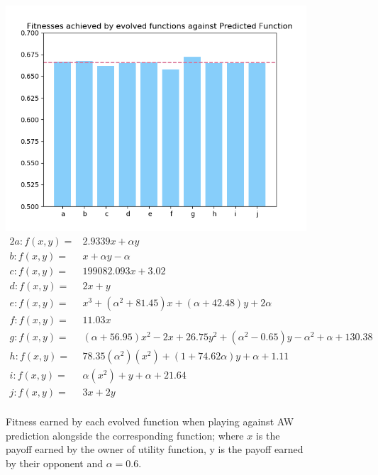 \documentclass[11pt]{book}
\begin{document}
\begin{figure}
	\centering
	\includegraphics[scale=0.7]{resources/ylim_barchart_fitness_earned_against_target_r_06.png}
	\begin{alignat*}{2}
		a: f(x, y) = & 2.9339x + \alpha y&\\
		b: f(x, y) = & x + \alpha y -\alpha &\\
		c: f(x, y) = & 199082.093x + 3.02&\\
		d: f(x, y) = & 2x + y&\\
		e: f(x, y) = & x^3 + (\alpha^2 + 81.45)x + (\alpha+42.48)y + 2\alpha &\\
		f: f(x, y) = & 11.03x&\\
		g: f(x, y) = & (\alpha + 56.95)x^2 - 2x + 26.75y^2  + (\alpha^2 - 0.65)y  - \alpha^2 + \alpha + 130.38&\\
		h: f(x, y) = & 78.35(\alpha^2)(x^2) + (1 +74.62\alpha )y + \alpha + 1.11&\\
		i: f(x, y) = & \alpha (x^2) + y + \alpha + 21.64&\\
		j: f(x, y) = & 3x + 2y&\\
	\end{alignat*}
	\caption{Fitness earned by each evolved function when playing against AW prediction alongside the corresponding function; where $x$ is the payoff earned by the owner of utility function, y is the payoff earned by their opponent and $\alpha = 0.6$.}
	\label{barchart_fitness_earned_against_target_r06}
\end{figure}
\end{document}
